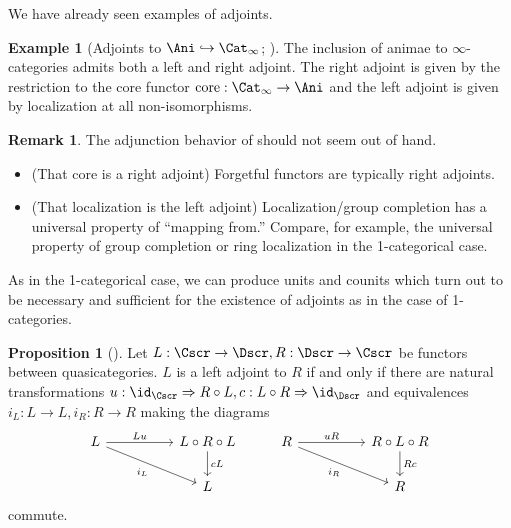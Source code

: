 \documentclass{amsart}
\theoremstyle{definition}
\newtheorem{example}[theorem]{Example}
\newtheorem{proposition}[theorem]{Proposition}
\newtheorem{remark}[theorem]{Remark}
\numberwithin{equation}{section}
\begin{document}
We have already seen examples of adjoints.
\begin{example}[Adjoints to $\Ani\hookrightarrow\Cat_{\infty}$; {\cite[Ex. 6.3]{Wagner}}]\label{ex: adjoints of animae inclusion}
  The inclusion of animae to $\infty$-categories admits both a left and right adjoint. The right adjoint is given by the restriction to the core functor $\mathrm{core}:\Cat_{\infty}\to\Ani$ and the left adjoint is given by localization at all non-isomorphisms.
\end{example}
\begin{remark}\label{rmk: adjoints}
  The adjunction behavior of  should not seem out of hand.
  \begin{itemize}
    \item (That $\mathrm{core}$ is a right adjoint) Forgetful functors are typically right adjoints.
    \item (That localization is the left adjoint) Localization/group completion has a universal property of ``mapping from.'' Compare, for example, the universal property of group completion or ring localization in the 1-categorical case.
  \end{itemize}
\end{remark}
As in the 1-categorical case, we can produce units and counits which turn out to be necessary and sufficient for the existence of adjoints as in the case of 1-categories.
\begin{proposition}[{\cite[Cons. 6.4, Lem. 6.5]{Wagner}}]\label{prop: triangle identities}
  Let $L:\Cscr\to\Dscr,R:\Dscr\to\Cscr$ be functors between quasicategories. $L$ is a left adjoint to $R$ if and only if there are natural transformations $u:\id_{\Cscr}\Rightarrow R\circ L, c:L\circ R\Rightarrow\id_{\Dscr}$ and equivalences $i_{L}:L\to L,i_{R}:R\to R$ making the diagrams
  $$%
  \begin{tikzcd}
    L && {L\circ R\circ L} & R && {R\circ L\circ R} \\
    && L &&& R
    \arrow["Lu", from=1-1, to=1-3]
    \arrow["{i_{L}}"', from=1-1, to=2-3]
    \arrow["cL", from=1-3, to=2-3]
    \arrow["uR", from=1-4, to=1-6]
    \arrow["{i_{R}}"', from=1-4, to=2-6]
    \arrow["Rc", from=1-6, to=2-6]
  \end{tikzcd}$$
  commute.
\end{proposition}
\end{document}
